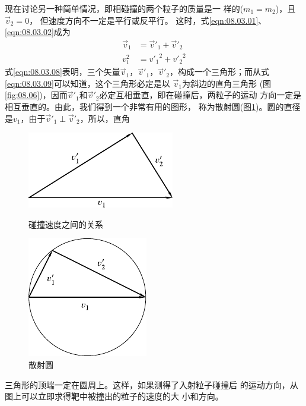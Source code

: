 现在讨论另一种简单情况，即相碰撞的两个粒子的质量是一
样的($ m _ { 1 } = m _ { 2 } $)，且$ \vec { v } _ { 2 } = 0 $，
但速度方向不一定是平行或反平行。
这时，式\eqref{eqn:08.03.01}、\eqref{eqn:08.03.02}成为
\begin{align}
  \vec { v } _ { 1 } & = \vec { v } ' _ { 1 } + \vec { v } ' _ { 2 } \label{eqn:08.03.08}       \\
  v _ 1 ^ { 2 }      & = { v ' _ { 1 } } ^ { 2 } + { v ' _ { 2 } } ^ { 2 } \label{eqn:08.03.09}
\end{align}
式\eqref{eqn:08.03.08}表明，三个矢量$ \vec { v } _ { 1 } $，$ \vec { v } ' _ { 1 } $，$ \vec { v } ' _ { 2 } $，构成一个三角形；而从式
\eqref{eqn:08.03.09}可以知道，这个三角形必定是以
$ \vec { v } _ { 1 } $为斜边的直角三角形
(图\ref{fig:08.06})，因而$ \vec { v } ' _ { 1 } $和$ \vec { v } ' _ { 2 } $必定互相垂直，即在碰撞后，两粒子的运动
方向一定是相互垂直的。由此，我们得到一个非常有用的图形，
称为散射圆(图\ref{fig:08.07})。圆的直径是$ v _ { 1 } $，由于$ \vec { v } ' _ { 1 } \perp \vec { v } ' _ 2 $，所以，直角
\begin{figure}[h]
  \begin{minipage}[b]{0.5\linewidth}
    \centering
    \includegraphics{figure/fig08.06}
    \caption{碰撞速度之间的关系}
    \label{fig:08.06}
  \end{minipage}
  \begin{minipage}[b]{0.5\linewidth}
    \centering
    \includegraphics{figure/fig08.07}
    \caption{散射圆}
    \label{fig:08.07}
  \end{minipage}
\end{figure}
三角形的顶端一定在圆周上。这样，如果测得了入射粒子碰撞后
的运动方向，从图上可以立即求得靶中被撞出的粒子的速度的大
小和方向。

